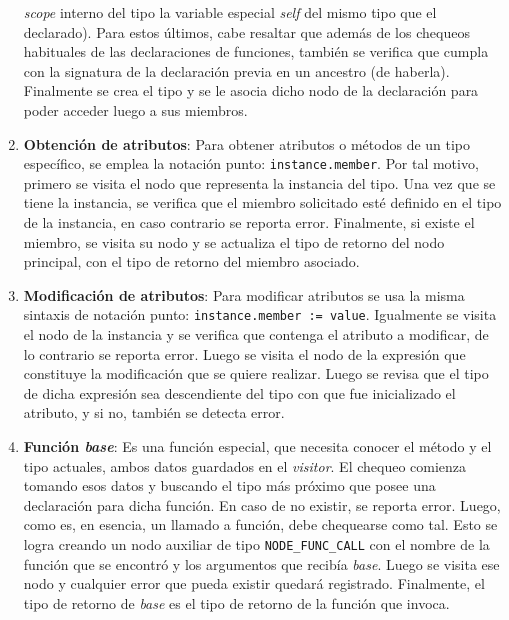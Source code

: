 \documentclass{llncs}
\begin{document}
\begin{enumerate}
    \textit{scope} interno del tipo la variable especial \textit{self} del mismo tipo que el declarado). Para estos últimos, cabe resaltar que además de los chequeos habituales de las declaraciones de funciones, también se verifica que cumpla con la signatura de la declaración previa en
    un ancestro (de haberla). Finalmente se crea el tipo y se le asocia dicho nodo de la declaración para poder acceder luego a sus miembros.
    \item \textbf{Obtención de atributos}: Para obtener atributos o métodos de un tipo específico, se emplea la notación punto: \texttt{instance.member}. Por tal motivo, primero se visita el nodo que representa la instancia del tipo. Una vez que se tiene la instancia, se verifica que el miembro 
    solicitado esté definido en el tipo de la instancia, en caso contrario se reporta error. Finalmente, si existe el miembro, se visita su nodo y se actualiza el tipo de retorno del nodo principal, con el tipo de retorno del miembro asociado.
    \item \textbf{Modificación de atributos}: Para modificar atributos se usa la misma sintaxis de notación punto: \texttt{instance.member := value}. Igualmente se visita el nodo de la instancia y se verifica que contenga el atributo a modificar, de lo contrario se reporta error. Luego 
    se visita el nodo de la expresión que constituye la modificación que se quiere realizar. Luego se revisa que el tipo de dicha expresión sea descendiente del tipo con que fue inicializado el atributo, y si no, también se detecta error.
    \item \textbf{Función \textit{base}}: Es una función especial, que necesita conocer el método y el tipo actuales, ambos datos guardados en el \textit{visitor}. El chequeo comienza tomando esos datos y buscando el tipo más próximo que posee una declaración para dicha función. En caso de 
    no existir, se reporta error. Luego, como es, en esencia, un llamado a función, debe chequearse como tal. Esto se logra creando un nodo auxiliar de tipo \texttt{NODE\_FUNC\_CALL} con el nombre de la función que se encontró y los argumentos que recibía \textit{base}. Luego se visita ese nodo y cualquier 
    error que pueda existir quedará registrado. Finalmente, el tipo de retorno de \textit{base} es el tipo de retorno de la función que invoca.
\end{enumerate}
\end{document}
